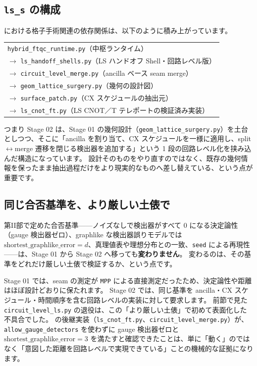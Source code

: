 \subsection{\texttt{ls\_s} の構成}

 における格子手術関連の依存関係は、以下のように積み上がっています。

\begin{center}
\begin{tabular}{l}
\texttt{hybrid\_ftqc\_runtime.py}（中枢ランタイム） \\
\quad $\rightarrow$ \texttt{ls\_handoff\_shells.py}（LS ハンドオフ Shell・回路レベル版） \\
\qquad $\rightarrow$ \texttt{circuit\_level\_merge.py}（ancilla ベース seam merge） \\
\qquad\quad $\rightarrow$ \texttt{geom\_lattice\_surgery.py}（幾何の設計図） \\
\qquad $\rightarrow$ \texttt{surface\_patch.py}（CX スケジュールの抽出元） \\
\qquad $\rightarrow$ \texttt{ls\_cnot\_ft.py}（LS CNOT／T テレポートの検証済み実装） \\
\end{tabular}
\end{center}

つまり Stage 02 は、Stage 01 の幾何設計（\texttt{geom\_lattice\_surgery.py}）を土台としつつ、そこに「ancilla を割り当て、CX スケジュールを一様に適用し、split$\leftrightarrow$merge 遷移を閉じる検出器を追加する」という 1 段の回路レベル化を挟み込んだ構造になっています。
設計そのものをやり直すのではなく、既存の幾何情報を保ったまま抽出過程だけをより現実的なものへ差し替えている、という点が重要です。

\subsection{同じ合否基準を、より厳しい土俵で}

第II部で定めた合否基準——ノイズなしで検出器がすべて 0 になる決定論性（gauge 検出器ゼロ）、graphlike な検出器誤りモデルでは $\mathrm{shortest\_graphlike\_error}=d$、真理値表や理想分布との一致、\texttt{seed} による再現性——は、Stage 01 から Stage 02 へ移っても\textbf{変わりません}。
変わるのは、その基準をどれだけ厳しい土俵で検証するか、という点です。

Stage 01 では、seam の測定が \texttt{MPP} による直接測定だったため、決定論性や距離はほぼ設計どおりに保たれます。
Stage 02 では、同じ基準を ancilla・CX スケジュール・時間順序を含む回路レベルの実装に対して要求します。
前節で見た \texttt{circuit\_level\_ls.py} の退役は、この「より厳しい土俵」で初めて表面化した不具合でした。
 の後継実装（\texttt{ls\_cnot\_ft.py}、\texttt{circuit\_level\_merge.py}）が、\texttt{allow\_gauge\_detectors} を使わずに gauge 検出器ゼロと $\mathrm{shortest\_graphlike\_error}=3$ を満たすと確認できたことは、単に「動く」のではなく「意図した距離を回路レベルで実現できている」ことの機械的な証拠になります。

